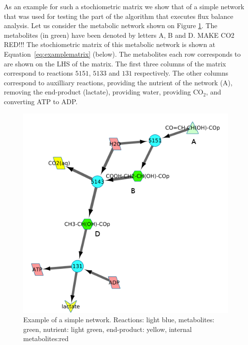 \documentclass[10pt,a4paper]{article}
\begin{document}
	As an example for such a stochiometric matrix we show that of a simple network that was used for testing the part of the algorithm that executes flux balance analysis. Let us consider the metabolic network shown on Figure \ref{fig:examplenetwork}. The metabolites (in green) have been denoted by letters A, B and D. MAKE CO2 RED!!! The stochiometric matrix of this metabolic network is shown at Equation~\ref{eq:examplematrix} (below). The metabolites each row corresponds to are shown on the LHS of the matrix. The first three columns of the matrix correspond to reactions $5151$, $5133$ and $131$ respectively. The other columns correspond to auxilliary reactions, providing the nutrient of the network (A), removing the end-product (lactate), providing water, providing CO$_2$, and converting ATP to ADP. 

\begin{figure}[t]
	\centering
	\includegraphics[width=0.5\linewidth]{initial_network_ABC.png}
	\caption{Example of a simple network. Reactions: light blue, metabolites: green, nutrient: light green, end-product: yellow, internal metabolites:red}
	\label{fig:examplenetwork}
\end{figure}
\end{document}
